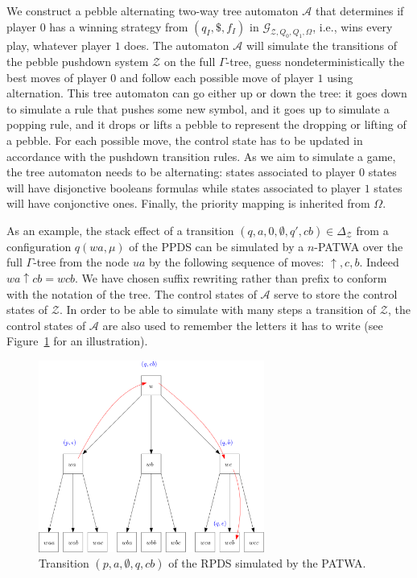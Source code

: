 \documentclass[a4paper,UKenglish,cleveref, autoref, thm-restate]{lipics-v2021}
\begin{document}
We construct a pebble alternating two-way tree automaton $\mathcal{A}$ that determines if player
$0$ has a winning strategy from $(q_I, \$, f_I)$ in $\mathcal{G}_{\mathcal{Z},Q_0,Q_1,\Omega}$, i.e., wins every play, whatever player $1$ does. 
The
automaton $\mathcal{A}$ will simulate the transitions of the pebble pushdown system $\mathcal{Z}$ on the full
$\Gamma$-tree, guess nondeterministically the best moves of player $0$ and follow each
possible move of player $1$ using alternation.
This tree automaton can
go either up or down the tree: it goes down to simulate a rule that pushes
some new symbol, and it goes up to simulate a popping rule, and it drops or lifts a pebble to represent the dropping or lifting of a pebble. For each possible move, the control state has to
be updated in accordance with the pushdown transition rules. As we aim to
simulate a game, the tree automaton needs to be alternating: states
 associated to player $0$ states will have disjonctive booleans formulas
  while states associated to
player $1$ states will have conjonctive ones.
Finally, the priority mapping is inherited from $\Omega$.

As an example, the stack effect of a transition $(q, a, 0, \emptyset, q' , cb)  \in \Delta_{\mathcal{Z}} $ from a configuration $q(wa, \mu)$
of
the PPDS can be simulated by a $n$-PATWA over the full
$\Gamma$-tree from the node $ua$ by the following sequence of moves: 
$\uparrow, c, b$. Indeed
$wa \! \uparrow cb = wcb$. We have chosen suffix rewriting rather than prefix to conform with
the notation of the tree. 
The control states of $\mathcal{A}$ serve to store the control states of $\mathcal{Z}$.
In order to be able to simulate with many steps a transition of $\mathcal{Z}$, the control states of $\mathcal{A}$ are also used to remember the letters it has to write (see Figure~\ref{stack simulation} for an illustration).


\begin{center}
	\begin{figure}
		\hspace{2.1cm}
\includegraphics[width=0.66\textwidth]{figures/stack_simulation}
	\caption{Transition $(p, a, \emptyset, q, cb)$ of the RPDS
	 simulated by the PATWA.}
	 \label{stack simulation}
	\end{figure}
\end{center}
\end{document}
